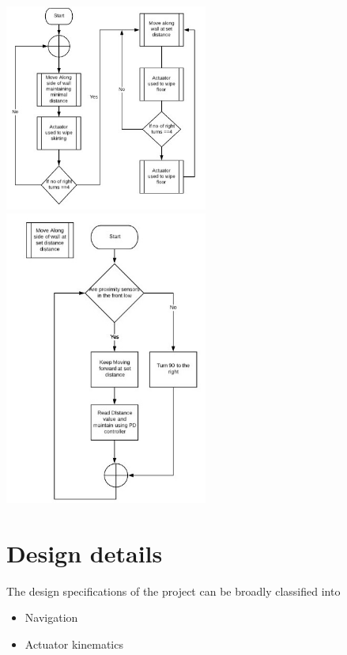\documentclass[12pt]{article}
\begin{document}
\begin{center}
\includegraphics[width=0.5\textwidth]{7.jpg}
\includegraphics[width=0.5\textwidth]{8.jpg}
\end{center}

\part{Design details}

The design specifications of the project can be broadly classified into 

\begin{itemize}
\item Navigation
\item Actuator kinematics
\end{itemize}
\end{document}
